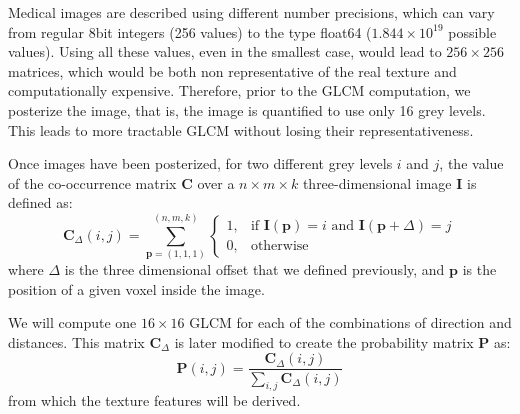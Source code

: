 Medical images are described using different number precisions, which can vary from regular 8bit integers (256 values) to the type float64 ($1.844\times10^{19}$ possible values). Using all these values, even in the smallest case, would lead to $256\times 256$ matrices, which would be both non representative of the real texture and computationally expensive. Therefore, prior to the \ac{GLCM} computation, we posterize the image, that is, the image is quantified to use only 16 grey levels. This leads to more tractable \ac{GLCM} without losing their representativeness. 

Once images have been posterized, for two different grey levels $i$ and $j$, the value of the co-occurrence matrix $\mathbf{C}$ over a $n \times m \times k$ three-dimensional image $\mathbf{I}$ is defined as: 
\begin{equation}\label{eq:cooc3D}
\mathbf{C}_{\Delta}(i,j)=\sum_{\mathbf{p}=(1,1,1)}^{(n,m,k)}\begin{cases} 1, & \mbox{if }\mathbf{I}(\mathbf{p})=i\mbox{ and }\mathbf{I}(\mathbf{p}+\Delta)=j \\ 0, & \mbox{otherwise}\end{cases}
\end{equation}
where $\Delta$ is the three dimensional offset that we defined previously, and $\mathbf{p}$ is the position of a given voxel inside the image. 

We will compute one $16\times16$ \ac{GLCM} for each of the combinations of direction and distances. This matrix $\mathbf{C}_{\Delta}$ is later modified to create the probability matrix $\mathbf{P}$ as: 
\begin{equation}
\mathbf{P}(i,j) = \frac{\mathbf{C}_{\Delta}(i,j)}{\sum_{i,j}\mathbf{C}_{\Delta}(i,j)}
\end{equation}
from which the texture features will be derived.

